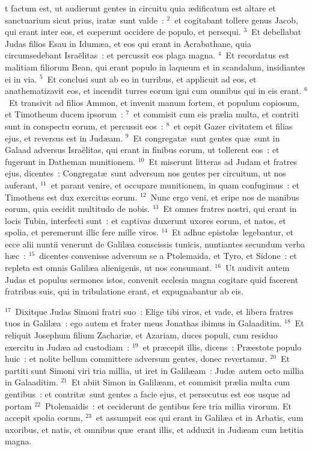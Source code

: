 \bchapter
{}t factum est, ut audierunt gentes in circuitu quia \ae dificatum est altare et sanctuarium sicut prius, irat\ae\ sunt valde~:
${}^{2}$~et cogitabant tollere genus Jacob, qui erant inter eos, et cœperunt occidere de populo, et persequi.
${}^{3}$~Et debellabat Judas filios Esau in Idum\ae a, et eos qui erant in Acrabathane, quia circumsedebant Isra\"elitas~: et percussit eos plaga magna.
${}^{4}$~Et recordatus est malitiam filiorum Bean, qui erant populo in laqueum et in scandalum, insidiantes ei in via.
${}^{5}$~Et conclusi sunt ab eo in turribus, et applicuit ad eos, et anathematizavit eos, et incendit turres eorum igni cum omnibus qui in eis erant.
${}^{6}$~Et transivit ad filios Ammon, et invenit manum fortem, et populum copiosum, et Timotheum ducem ipsorum~:
${}^{7}$~et commisit cum eis pr\ae lia multa, et contriti sunt in conspectu eorum, et percussit eos~:
${}^{8}$~et cepit Gazer civitatem et filias ejus, et reversus est in Jud\ae am.
${}^{9}$~Et congregat\ae\ sunt gentes qu\ae\ sunt in Galaad adversus Isra\"elitas, qui erant in finibus eorum, ut tollerent eos~: et fugerunt in Datheman munitionem.
${}^{10}$~Et miserunt litteras ad Judam et fratres ejus, dicentes~: Congregat\ae\ sunt adversum nos gentes per circuitum, ut nos auferant,
${}^{11}$~et parant venire, et occupare munitionem, in quam confugimus~: et Timotheus est dux exercitus eorum.
${}^{12}$~Nunc ergo veni, et eripe nos de manibus eorum, quia cecidit multitudo de nobis.
${}^{13}$~Et omnes fratres nostri, qui erant in locis Tubin, interfecti sunt~: et captivas duxerunt uxores eorum, et natos, et spolia, et peremerunt illic fere mille viros.
${}^{14}$~Et adhuc epistol\ae\ legebantur, et ecce alii nuntii venerunt de Galil\ae a conscissis tunicis, nuntiantes secundum verba h\ae c~:
${}^{15}$~dicentes convenisse adversum se a Ptolemaida, et Tyro, et Sidone~: et repleta est omnis Galil\ae a alienigenis, ut nos consumant.
${}^{16}$~Ut audivit autem Judas et populus sermones istos, convenit ecclesia magna cogitare quid facerent fratribus suis, qui in tribulatione erant, et expugnabantur ab eis.


${}^{17}$~Dixitque Judas Simoni fratri suo~: Elige tibi viros, et vade, et libera fratres tuos in Galil\ae a~: ego autem et frater meus Jonathas ibimus in Galaaditim.
${}^{18}$~Et reliquit Josephum filium Zachari\ae , et Azariam, duces populi, cum residuo exercitu in Jud\ae a ad custodiam~:
${}^{19}$~et pr\ae cepit illis, dicens~: Pr\ae estote populo huic~: et nolite bellum committere adversum gentes, donec revertamur.
${}^{20}$~Et partiti sunt Simoni viri tria millia, ut iret in Galil\ae am~: Jud\ae\ autem octo millia in Galaaditim.
${}^{21}$~Et abiit Simon in Galil\ae am, et commisit pr\ae lia multa cum gentibus~: et contrit\ae\ sunt gentes a facie ejus, et persecutus est eos usque ad portam
${}^{22}$~Ptolemaidis~: et ceciderunt de gentibus fere tria millia virorum. Et accepit spolia eorum,
${}^{23}$~et assumpsit eos qui erant in Galil\ae a et in Arbatis, cum uxoribus, et natis, et omnibus qu\ae\ erant illis, et adduxit in Jud\ae am cum l\ae titia magna.


